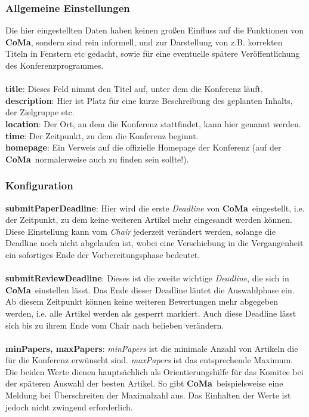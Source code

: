 \documentclass[headexclude,footexclude,12pt,BCOR0pt,DIV15]{scrartcl}
\newcommand{\CoMa}{\textbf{CoMa}}
\begin{document}
      \subsubsection{Allgemeine Einstellungen}
        Die hier eingestellten Daten haben keinen gro{\ss}en Einfluss auf die Funktionen von \CoMa, sondern
        sind rein informell, und zur Darstellung von z.B. korrekten Titeln in Fenstern etc gedacht, sowie f\"{u}r eine
        eventuelle sp\"{a}tere Ver\"{o}ffentlichung des Konferenzprogrammes.\\
        \\
        \textbf{title}: Dieses Feld nimmt den Titel auf, unter dem die Konferenz l\"{a}uft.
        \\
        \textbf{description}: Hier ist Platz f\"{u}r eine kurze Beschreibung des geplanten Inhalts, der Zielgruppe etc.
        \\
        \textbf{location}: Der Ort, an dem die Konferenz stattfindet, kann hier genannt werden.
        \\
        \textbf{time}: Der Zeitpunkt, zu dem die Konferenz beginnt.
        \\
        \textbf{homepage}: Ein Verweis auf die offizielle Homepage der Konferenz (auf der \CoMa\ normalerweise auch zu finden sein sollte!).

      \subsubsection{Konfiguration}
        \textbf{submitPaperDeadline}: Hier wird die erste \emph{Deadline} von \CoMa\ eingestellt, i.e. der Zeitpunkt, zu dem keine
            weiteren Artikel mehr eingesandt werden k\"{o}nnen. Diese Einstellung kann vom \emph{Chair} jederzeit ver\"{a}ndert werden, solange die
            Deadline noch nicht abgelaufen ist, wobei eine Verschiebung in die Vergangenheit ein sofortiges Ende der Vorbereitungsphase bedeutet.
        \\
        \\
        \textbf{submitReviewDeadline}: Dieses ist die zweite wichtige \emph{Deadline}, die sich in \CoMa\ einstellen l\"{a}sst. Das Ende dieser
            Deadline l\"{a}utet die Auswahlphase ein. Ab diesem Zeitpunkt k\"{o}nnen keine weiteren Bewertungen mehr abgegeben werden, i.e. alle
            Artikel werden als gesperrt markiert. Auch diese Deadline l\"{a}sst sich bis zu ihrem Ende vom Chair nach belieben ver\"{a}ndern.
        \\
        \\
        \textbf{minPapers, maxPapers}: \emph{minPapers} ist die minimale Anzahl von Artikeln die f\"{u}r die Konferenz erw\"{u}nscht sind. \emph{maxPapers}
            ist das entsprechende Maximum. Die beiden Werte dienen haupts\"{a}chlich als Orientierungshilfe f\"{u}r das Komitee bei der sp\"{a}teren
            Auswahl der besten Artikel. So gibt \CoMa\ beispielsweise eine Meldung bei \"{U}berschreiten der Maximalzahl aus. Das Einhalten der Werte
            ist jedoch nicht zwingend erforderlich.
\end{document}
